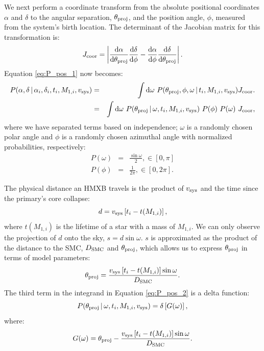 \documentclass[12pt, preprint]{aastex}
\newcommand{\given}{\,|\,}
\newcommand{\dd}{\mathrm{d}}
\begin{document}
We next perform a coordinate transform from the absolute positional coordinates $\alpha$ and $\delta$ to the angular separation, $\theta_{\rm proj}$, and the position angle, $\phi$, measured from the system's birth location. The determinant of the Jacobian matrix for this transformation is:
\begin{equation}
J_{\rm coor} = \left| \frac{\dd \alpha}{\dd \theta_{\rm proj}} \frac{\dd \delta}{\dd \phi} - \frac{\dd \alpha}{\dd \phi} \frac{\dd \delta}{\dd \theta_{\rm proj}} \right|.
\end{equation}
Equation \ref{eq:P_pos_1} now becomes:
\begin{eqnarray}
P(\alpha, \delta \given \alpha_i, \delta_i, t_i, M_{1,i}, v_{\rm sys} ) &=& \int \dd \omega\ P(\theta_{\rm proj}, \phi, \omega \given t_i, M_{1,i}, v_{\rm sys} ) J_{\rm coor}. \nonumber \\
&=& \int \dd \omega\ P(\theta_{\rm proj} \given \omega,  t_i, M_{1,i}, v_{\rm sys} )\ P(\phi)\ P(\omega)\ J_{\rm coor}, \label{eq:P_pos_2}
\end{eqnarray}
where we have separated terms based on independence; $\omega$ is a randomly chosen polar angle and $\phi$ is a randomly chosen azimuthal angle with normalized probabilities, respectively: 
\begin{eqnarray}
P(\omega) &=& \frac{\sin \omega} {2}, \in [0,\pi] \\
P(\phi) &=& \frac{1}{2 \pi}, \in [0, 2\pi].
\end{eqnarray}


The physical distance an HMXB travels is the product of $v_{\rm sys}$ and the time since the primary's core collapse:
\begin{equation}
d = v_{\rm sys} \left[t_i - t(M_{1,i}) \right],
\end{equation}
where $t(M_{1,i})$ is the lifetime of a star with a mass of $M_{1,i}$. We can only observe the projection of $d$ onto the sky, $s = d \sin \omega$. $s$ is approximated as the product of the distance to the SMC, $D_{\rm SMC}$ and $\theta_{\rm proj}$, which allows us to express $\theta_{\rm proj}$ in terms of model parameters:
\begin{equation}
\theta_{\rm proj} = \frac{v_{\rm sys} \left[ t_i - t(M_{1,i}) \right] \sin \omega}{D_{\rm SMC}}. \label{eq:theta_proj}
\end{equation}
The third term in the integrand in Equation \ref{eq:P_pos_2} is a delta function:
\begin{equation}
P(\theta_{\rm proj} \given \omega, t_i, M_{1,i}, v_{\rm sys}) = \delta \left[G(\omega)\right], \label{eq:P_theta_proj}
\end{equation}
where:
\begin{equation}
G(\omega) = \theta_{\rm proj} - \frac{v_{\rm sys} \left[t_i - t(M_{1,i}) \right] \sin \omega}{D_{\rm SMC}}.\end{equation}
\end{document}
